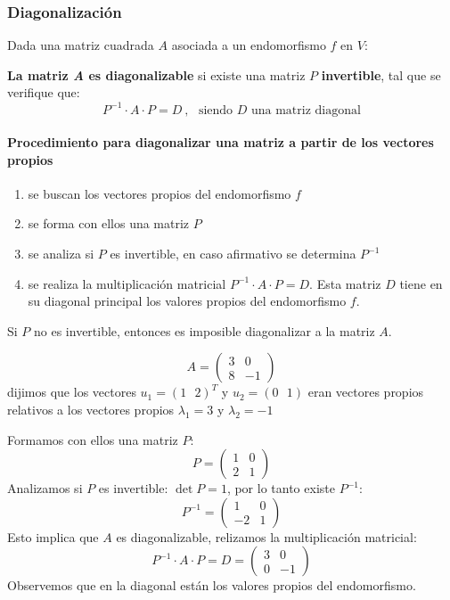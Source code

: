 \subsubsection{Diagonalización}

Dada una matriz cuadrada \(A\) asociada a un endomorfismo \(f\) en \(V\):

\textbf{La matriz \textit{A} es diagonalizable} si existe una matriz \(P\) \textbf{invertible}, tal que se verifique que:
\[
  P^{-1} \cdot A \cdot P = D~ , ~~~ \text{siendo } D \text{ una matriz diagonal}
\]
\paragraph{Procedimiento para diagonalizar una matriz a partir de los vectores propios}

\begin{enumerate}[label=\(\arabic{*}^\circ\)]
  \item se buscan los vectores propios del endomorfismo \(f\)
  \item se forma con ellos una matriz \(P\)
  \item se analiza si \(P\) es invertible, en caso afirmativo se determina \(P^{-1}\)
  \item se realiza la multiplicación matricial \(P^{-1}\cdot A \cdot P = D\). Esta matriz \(D\) tiene en su diagonal principal los valores propios del endomorfismo \(f\). 
\end{enumerate}
Si \(P\) no es invertible, entonces es imposible diagonalizar a la matriz \(A\).

\[
  A = \begin{pmatrix}
    3 & 0 \\ 8 & -1
  \end{pmatrix}
\]
dijimos que los vectores \(u_1=(1 ~~~ 2)^T\) y \(u_2 =(0 ~~~ 1)\) eran vectores propios relativos a los vectores propios \(\lambda_1 = 3\) y \(\lambda_2 = -1\)

Formamos con ellos una matriz \(P\):
\[
  P = \begin{pmatrix}
    1 & 0 \\
    2 & 1 
  \end{pmatrix}
\]
Analizamos si \(P\) es invertible: \(\det P = 1\), por lo tanto existe \(P^{-1}\):
\[
P^{-1} = \begin{pmatrix}
  1 & 0 \\
  -2 & 1
\end{pmatrix}
\]
Esto implica que \(A\) es diagonalizable, relizamos la multiplicación matricial:
\[
P^{-1} \cdot A \cdot P = D = \begin{pmatrix}
  3 & 0 \\
  0 & -1
\end{pmatrix}
\]
Observemos que en la diagonal están los valores propios del endomorfismo.

